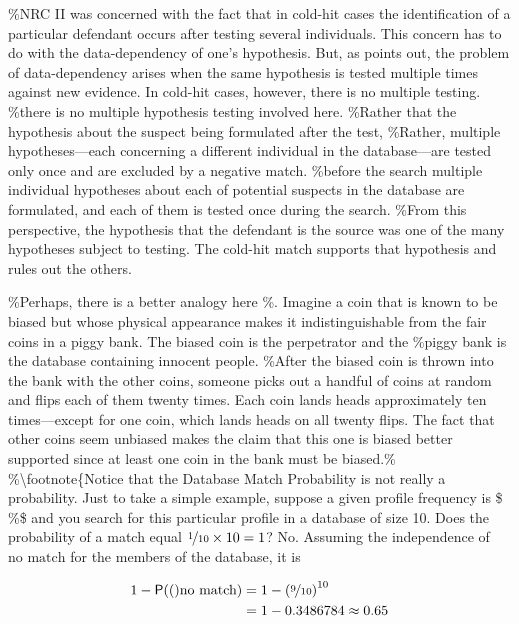 \documentclass[10pt,dvipsnames,enabledeprecatedfontcommands]{scrartcl}
\newcommand{\pr}[1]{\mathsf{P}(#1)}
\begin{document}
\%NRC II was concerned with the fact that in cold-hit cases the
identification of a particular defendant occurs after testing several
individuals. This concern has to do with the data-dependency of one's
hypothesis. But, as \citet{balding2002DNDatabaseSearch} points out, the
problem of data-dependency arises when the same hypothesis is tested
multiple times against new evidence. In cold-hit cases, however, there
is no multiple testing. \%there is no multiple hypothesis testing
involved here. \%Rather that the hypothesis about the suspect being
formulated after the test, \%Rather, multiple hypotheses---each
concerning a different individual in the database---are tested only once
and are excluded by a negative match. \%before the search multiple
individual hypotheses about each of potential suspects in the database
are formulated, and each of them is tested once during the search.
\%From this perspective, the hypothesis that the defendant is the source
was one of the many hypotheses subject to testing. The cold-hit match
supports that hypothesis and rules out the others.

\%Perhaps, there is a better analogy here
\%\citep[p.\ 950]{donnelly1999DNADatabaseSearches}. Imagine a coin that
is known to be biased but whose physical appearance makes it
indistinguishable from the fair coins in a piggy bank. The biased coin
is the perpetrator and the \%piggy bank is the database containing
innocent people. \%After the biased coin is thrown into the bank with
the other coins, someone picks out a handful of coins at random and
flips each of them twenty times. Each coin lands heads approximately ten
times---except for one coin, which lands heads on all twenty flips. The
fact that other coins seem unbiased makes the claim that this one is
biased better supported since at least one coin in the bank must be
biased.\% \%\textbackslash{}footnote\{Notice that the Database Match
Probability is not really a probability. Just to take a simple example,
suppose a given profile frequency is \$ \%\$ and you
search for this particular profile in a database of size 10. Does the
probability of a match equal \(\nicefrac{1}{10}\times 10=1\)? No.
Assuming the independence of \(\textrm{no match}\) for the members of
the database, it is

\begin{align*}
1-\pr(\textrm{no match}) & = 1- \left(\nicefrac{9}{10}\right)^{10}\\
& = 1- 0.3486784 \approx 0.65
\end{align*}
\end{document}
